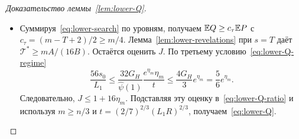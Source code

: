 \begin{proof}[Доказательство леммы~\ref{lem:lower-Q}]
\begin{itemize}
\item Суммируя~\eqref{eq:lower-search} по уровням, получаем
$\mathbb E Q\ge c_\tau\mathbb E P$ с $c_\tau=(m-T+2)/2\ge m/4$.
Лемма~\ref{lem:lower-revelations} при $s=T$ даёт
$\mathcal T^\ast\ge mA/(16B)$.
Остаётся оценить $J$. По третьему условию~\eqref{eq:lower-Q-regime}
\[
 \frac{56s_0}{L_1}
 \le\frac{32G_H}{\widehat\psi(1)}\frac{e^{\eta_m}\eta_m}{t}
 \le\frac{4G_H}{3}e^{\eta_m}
 =\frac56e^{\eta_m}.
\]
Следовательно, $J\le1+16\eta_m$. Подставляя эту оценку
в~\eqref{eq:lower-Q-ratio} и используя $m\ge n/3$ и
$t=(2/7)^{2/3}(L_1R)^{2/3}$, получаем~\eqref{eq:lower-Q}.
\end{itemize}
\end{proof}
